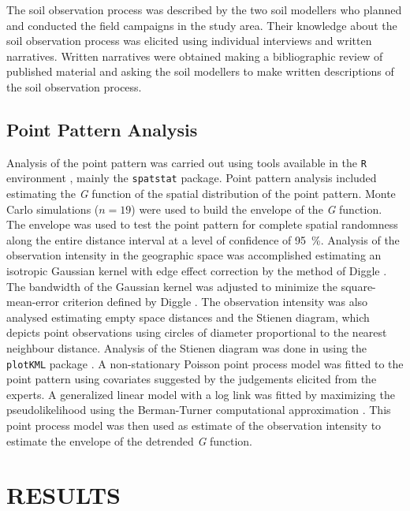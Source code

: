 The soil observation process was described by the two soil modellers who planned and conducted the field 
campaigns in the study area. Their knowledge about the soil observation process was elicited using individual 
interviews and written narratives. Written narratives were obtained making a bibliographic review of published 
material and asking the soil modellers to make written descriptions of the soil observation process.

\subsection{Point Pattern Analysis}

Analysis of the point pattern was carried out using tools available in the \texttt{R} environment 
\cite{R2013}, mainly the \texttt{spatstat} \cite{Baddeley2010} package. Point pattern analysis included 
estimating the \emph{G} function of the spatial distribution of the point pattern. Monte Carlo simulations ($n 
= 19$) were used to build the envelope of the \emph{G} function. The envelope was used to test the point 
pattern for complete spatial randomness along the entire distance interval at a level of confidence of 
\SI{95}{\percent}. Analysis of the observation intensity in the geographic space was accomplished estimating 
an isotropic Gaussian kernel with edge effect correction by the method of Diggle \cite{Diggle1985}. The 
bandwidth of the Gaussian kernel was adjusted to minimize the square-mean-error criterion defined by Diggle 
\cite{Diggle1985}. The observation intensity was also analysed estimating empty space distances and the 
Stienen diagram, which depicts point observations using circles of diameter proportional to the nearest 
neighbour distance. Analysis of the Stienen diagram was done in \googleearth{} using the \texttt{plotKML} 
package \cite{Hengl2013}. A non-stationary Poisson point process model was fitted to the point pattern using 
covariates suggested by the judgements elicited from the experts. A generalized linear model with a log link 
was fitted by maximizing the pseudolikelihood using the Berman-Turner computational approximation 
\cite{Baddeley2010}. This point process model was then used as estimate of the observation intensity to 
estimate the envelope of the detrended \emph{G} function.

\section{RESULTS}

